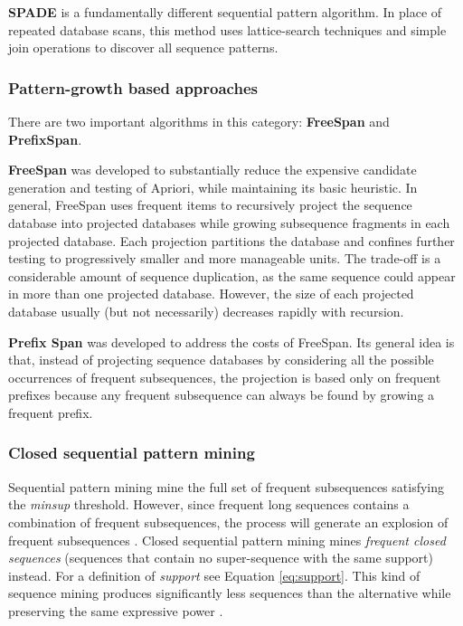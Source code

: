 \textbf{SPADE} \cite{zaki2001spade} is a fundamentally different sequential pattern algorithm. In place of repeated database scans, this method uses lattice-search techniques and simple join operations to discover all sequence patterns.

\subsubsection*{Pattern-growth based approaches} 

There are two important algorithms in this category: \textbf{FreeSpan} and \textbf{PrefixSpan}.

\textbf{FreeSpan} \cite{han2000freespan} was developed to substantially reduce the expensive candidate generation and testing of Apriori, while maintaining its basic heuristic. In general, FreeSpan uses frequent items to recursively project the sequence database into projected databases while growing subsequence fragments in each projected database. Each projection partitions the database and confines further testing to progressively smaller and more manageable units. The trade-off is a considerable amount of sequence duplication, as the same sequence could appear in more than one projected database. However, the size of each projected database usually (but not necessarily) decreases rapidly with recursion. 

\textbf{Prefix Span} \cite{pei2004mining} was developed to address the costs of FreeSpan. Its general idea is that, instead of projecting sequence databases by considering all the possible occurrences of frequent subsequences, the projection is based only on frequent prefixes because any frequent subsequence can always be found by growing a frequent prefix. 

\subsubsection*{Closed sequential pattern mining}
Sequential pattern mining mine the full set of frequent subsequences satisfying the \textit{minsup} threshold. However, since frequent long sequences contains a combination of frequent subsequences, the process will generate an explosion of frequent subsequences \cite{yan2003clospan}. Closed sequential pattern mining mines \textit{frequent closed sequences} (sequences that contain no super-sequence with the same support) instead. For a definition of \textit{support} see Equation \ref{eq:support}. This kind of sequence mining produces significantly less sequences than the alternative while preserving the same expressive power \cite{yan2003clospan}.

